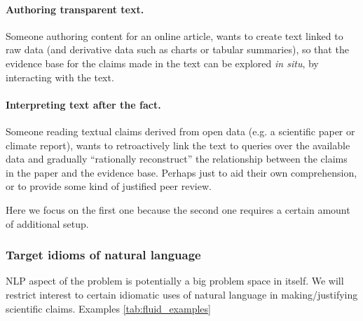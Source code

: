 \paragraph{Authoring transparent text.} Someone authoring content for an online article, wants to create text
linked to raw data (and derivative data such as charts or tabular summaries), so that the evidence base for
the claims made in the text can be explored \emph{in situ}, by interacting with the text.

\paragraph{Interpreting text after the fact.} Someone reading textual claims derived from open data (e.g. a
scientific paper or climate report), wants to retroactively link the text to queries over the available data
and gradually ``rationally reconstruct'' the relationship between the claims in the paper and the evidence
base. Perhaps just to aid their own comprehension, or to provide some kind of justified peer review.

\vspace{2mm}
\noindent Here we focus on the first one because the second one requires a certain amount of additional setup.

\subsubsection{Target idioms of natural language}

NLP aspect of the problem is potentially a big problem space in itself. We will restrict interest to certain
idiomatic uses of natural language in making/justifying scientific claims.
Examples \ref{tab:fluid_examples}

